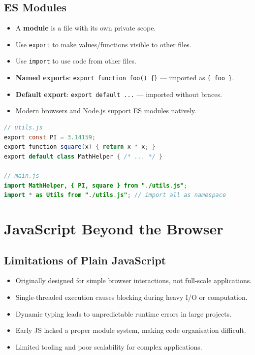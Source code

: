 \documentclass[hidelinks]{article}
\begin{document}
\subsection{ES Modules}
\begin{itemize}
  \item A \textbf{module} is a file with its own private scope.
  \item Use \texttt{export} to make values/functions visible to other files.
  \item Use \texttt{import} to use code from other files.
  \item \textbf{Named exports}: \texttt{export function foo() \{\}} --- imported as \texttt{\{ foo \}}.
  \item \textbf{Default export}: \texttt{export default ...} --- imported without braces.
  \item Modern browsers and Node.js support ES modules natively.
\end{itemize}

\begin{lstlisting}[language=Java, caption={ES module syntax}]
// utils.js
export const PI = 3.14159;
export function square(x) { return x * x; }
export default class MathHelper { /* ... */ }

// main.js
import MathHelper, { PI, square } from "./utils.js";
import * as Utils from "./utils.js"; // import all as namespace
\end{lstlisting}

\newpage
\section{JavaScript Beyond the Browser}

\subsection{Limitations of Plain JavaScript}
\begin{itemize}
  \item Originally designed for simple browser interactions, not full-scale applications.
  \item Single-threaded execution causes blocking during heavy I/O or computation.
  \item Dynamic typing leads to unpredictable runtime errors in large projects.
  \item Early JS lacked a proper module system, making code organisation difficult.
  \item Limited tooling and poor scalability for complex applications.
\end{itemize}
\end{document}
